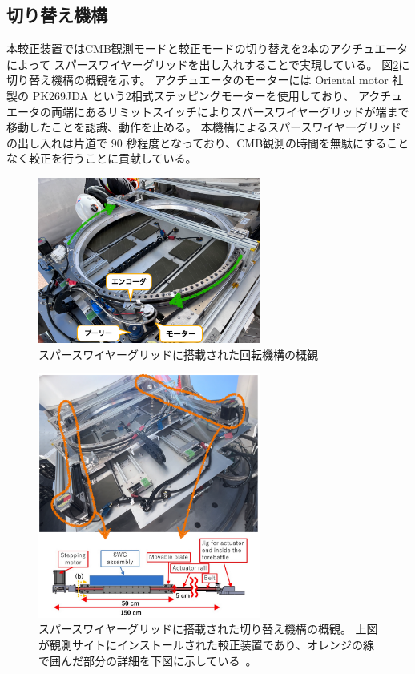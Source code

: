 \documentclass[../../main.tex]{subfiles}
\begin{document}
\subsection{切り替え機構}
本較正装置ではCMB観測モードと較正モードの切り替えを2本のアクチュエータによって
スパースワイヤーグリッドを出し入れすることで実現している。
図\ref{fig:gridloader}に切り替え機構の概観を示す。
アクチュエータのモーターには Oriental motor 社製の PK269JDA という2相式ステッピングモーターを使用しており、
アクチュエータの両端にあるリミットスイッチによりスパースワイヤーグリッドが端まで移動したことを認識、動作を止める。
本機構によるスパースワイヤーグリッドの出し入れは片道で $90$ 秒程度となっており、CMB観測の時間を無駄にすることなく較正を行うことに貢献している\cite{swg:nakata}。
\begin{figure}[H]
    \centering
    \includegraphics[width=0.65\textwidth]{wiregrid/rotation_parts.pdf}
    \caption{スパースワイヤーグリッドに搭載された回転機構の概観}
    \label{fig:rotation_parts}
\end{figure}
\begin{figure}[H]
    \centering
    \includegraphics[width=0.65\textwidth]{wiregrid/wiregrid_actuator.pdf}
    \caption[スパースワイヤーグリッドに搭載された切り替え機構の概観]{スパースワイヤーグリッドに搭載された切り替え機構の概観。
    上図が観測サイトにインストールされた較正装置であり、オレンジの線で囲んだ部分の詳細を下図に示している~\cite{swg:Murata_2023}。}
    \label{fig:gridloader}
\end{figure}
\end{document}
